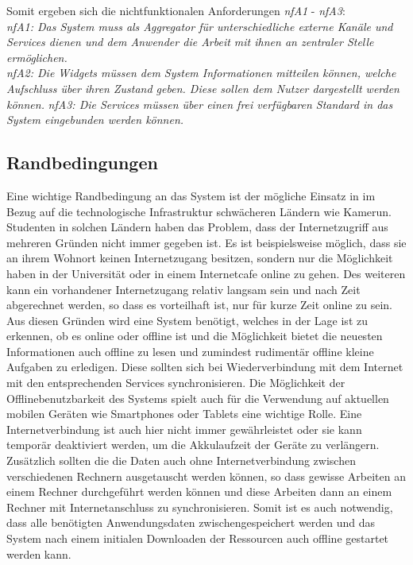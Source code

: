 Somit ergeben sich die nichtfunktionalen Anforderungen \emph{nfA1} - \emph{nfA3}:\\
\emph{nfA1: Das System muss als Aggregator für unterschiedliche externe Kanäle und Services dienen und dem Anwender die Arbeit mit ihnen an zentraler Stelle ermöglichen.}\\
\emph{nfA2: Die Widgets müssen dem System Informationen mitteilen können, welche Aufschluss über ihren Zustand geben. Diese sollen dem Nutzer dargestellt werden können.}
\emph{nfA3: Die Services müssen über einen frei verfügbaren Standard in das System eingebunden werden können.}

\subsection{Randbedingungen}
Eine wichtige Randbedingung an das System ist der mögliche Einsatz in im Bezug auf die technologische Infrastruktur schwächeren Ländern wie Kamerun. Studenten in solchen Ländern  haben das Problem, dass der Internetzugriff aus mehreren Gründen nicht immer gegeben ist. Es ist beispielsweise möglich, dass sie an ihrem Wohnort keinen Internetzugang besitzen, sondern nur die Möglichkeit haben in der Universität oder in einem Internetcafe online zu gehen. Des weiteren kann ein vorhandener Internetzugang relativ langsam sein und nach Zeit abgerechnet werden, so dass es vorteilhaft ist, nur für kurze Zeit online zu sein. Aus diesen Gründen wird eine System benötigt, welches in der Lage ist zu erkennen, ob es online oder offline ist und die Möglichkeit bietet die neuesten Informationen auch offline zu lesen und zumindest rudimentär offline kleine Aufgaben zu erledigen. Diese sollten sich bei Wiederverbindung mit dem Internet mit den entsprechenden Services synchronisieren. Die Möglichkeit der Offlinebenutzbarkeit des Systems spielt auch für die Verwendung auf aktuellen mobilen Geräten wie Smartphones oder Tablets eine wichtige Rolle. Eine Internetverbindung ist auch hier nicht immer gewährleistet oder sie kann temporär deaktiviert werden, um die Akkulaufzeit der Geräte zu verlängern.
Zusätzlich sollten die die Daten auch ohne Internetverbindung zwischen verschiedenen Rechnern ausgetauscht werden können, so dass gewisse Arbeiten an einem Rechner durchgeführt werden können und diese Arbeiten dann an einem Rechner mit Internetanschluss zu synchronisieren. Somit ist es auch notwendig, dass alle benötigten Anwendungsdaten zwischengespeichert werden und das System nach einem initialen Downloaden der Ressourcen auch offline gestartet werden kann.
